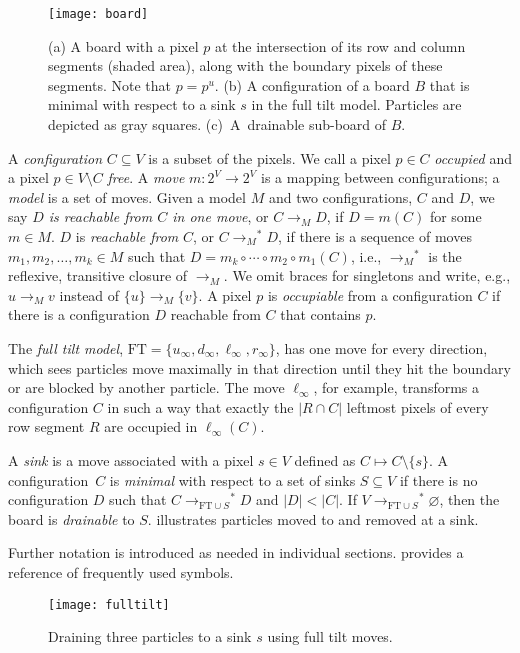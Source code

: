 \documentclass[a4paper,UKenglish,cleveref,thm-restate]{lipics-v2021}
\newcommand{\FT}{\ensuremath{\mathrm{FT}}\xspace}
\newcommand{\rOne}[1][M]{\ensuremath{\rightarrow_{#1}}}
\newcommand{\rStar}[1][M]{\rOne[#1]^*}
\newcommand{\mSeq}[1][k]{\ensuremath{m_1,m_2,\ldots,m_{#1}}}
\newcommand{\mComp}[1][k]{\ensuremath{m_{#1}\circ\cdots\circ m_2 \circ m_1}}
\begin{document}
\begin{figure}[htb]
\centering
\texttt{[image: board]}\caption{(a) A board with a pixel $p$ at the intersection of its row and column
  segments (shaded area), along with the boundary pixels of these segments. Note
  that $p=p^u$. (b) A configuration of a board $B$ that is minimal with respect to a
  sink $s$ in the full tilt model. Particles are depicted as gray squares. (c)~A~drainable sub-board
  of $B$.}\label{fig:board}
\end{figure}

A \emph{configuration}
$C \subseteq V$ is a subset of the pixels. We call a pixel $p \in C$
\emph{occupied} and a pixel $p \in V \setminus C$ \emph{free}. A \emph{move}
\(m: 2^V \to 2^V\) is a mapping between configurations; a \emph{model} is a set
of moves. Given a model $M$ and two configurations, $C$ and $D$, we say
\emph{$D$ is reachable from $C$ in one move}, or $C \rOne D$, if $D = m(C)$ for
some $m \in M$. $D$ is \emph{reachable from} $C$, or $C \rStar D$, if there is a
sequence of moves $\mSeq \in M$ such that $D = \mComp(C)$, i.e., $\rStar$ is the
reflexive, transitive closure of $\rOne$. We omit braces for singletons and
write, e.g., $u \rOne v$ instead of \(\{u\} \rOne \{v\}\). A pixel $p$ is
\emph{occupiable} from a configuration $C$ if there is a configuration $D$
reachable from $C$ that contains $p$.

The \emph{full tilt model}, \(\FT = \{u_\infty, d_\infty, \ell_\infty,
r_\infty\}\), has one move for every direction, which sees particles move
maximally in that direction until they hit the boundary or are blocked by
another particle. The move $\ell_\infty$, for example, transforms a
configuration $C$ in such a way that exactly the $|R \cap C|$ leftmost
pixels of every row segment $R$ are occupied in $\ell_\infty(C)$.

A \emph{sink} is a move associated with a pixel $s \in V$
defined as \(C \mapsto C \setminus \{s\}\). A configuration~$C$ is
\emph{minimal} with respect to a set of sinks $S \subseteq V$ if there is no
configuration $D$ such that $C \rStar[\FT \cup S] D$ and $|D| < |C|$. If \(V
\rStar[\FT \cup S] \varnothing\), then the board is \emph{drainable} to $S$.
 illustrates particles moved to and removed at a sink.

Further notation is introduced as needed in individual sections.
 provides a reference of frequently used symbols.

\begin{figure}[htb]
\centering
\texttt{[image: fulltilt]}\caption{Draining three particles to a sink $s$ using full tilt
  moves.}\label{fig:fulltilt}
\end{figure}
\end{document}
